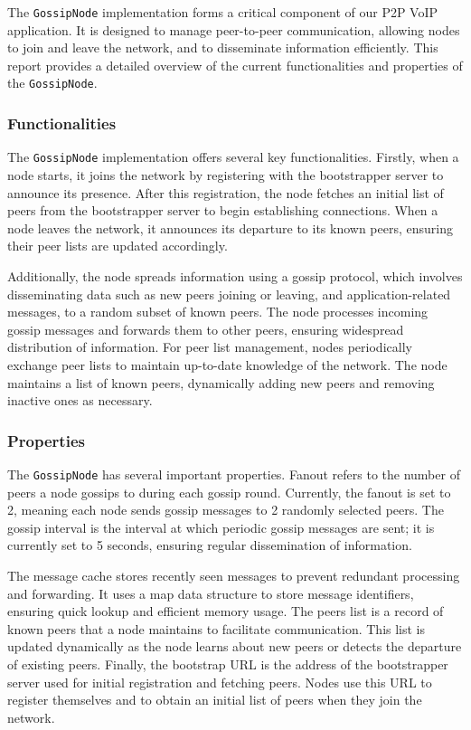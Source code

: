 The \texttt{GossipNode} implementation forms a critical component of our P2P VoIP application. It is designed to manage peer-to-peer communication, allowing nodes to join and leave the network, and to disseminate information efficiently. This report provides a detailed overview of the current functionalities and properties of the \texttt{GossipNode}.

\subsubsection{Functionalities}

The \texttt{GossipNode} implementation offers several key functionalities. Firstly, when a node starts, it joins the network by registering with the bootstrapper server to announce its presence. After this registration, the node fetches an initial list of peers from the bootstrapper server to begin establishing connections. When a node leaves the network, it announces its departure to its known peers, ensuring their peer lists are updated accordingly.

Additionally, the node spreads information using a gossip protocol, which involves disseminating data such as new peers joining or leaving, and application-related messages, to a random subset of known peers. The node processes incoming gossip messages and forwards them to other peers, ensuring widespread distribution of information. For peer list management, nodes periodically exchange peer lists to maintain up-to-date knowledge of the network. The node maintains a list of known peers, dynamically adding new peers and removing inactive ones as necessary.

\subsubsection{Properties}

The \texttt{GossipNode} has several important properties. Fanout refers to the number of peers a node gossips to during each gossip round. Currently, the fanout is set to 2, meaning each node sends gossip messages to 2 randomly selected peers. The gossip interval is the interval at which periodic gossip messages are sent; it is currently set to 5 seconds, ensuring regular dissemination of information.

The message cache stores recently seen messages to prevent redundant processing and forwarding. It uses a map data structure to store message identifiers, ensuring quick lookup and efficient memory usage. The peers list is a record of known peers that a node maintains to facilitate communication. This list is updated dynamically as the node learns about new peers or detects the departure of existing peers. Finally, the bootstrap URL is the address of the bootstrapper server used for initial registration and fetching peers. Nodes use this URL to register themselves and to obtain an initial list of peers when they join the network.



